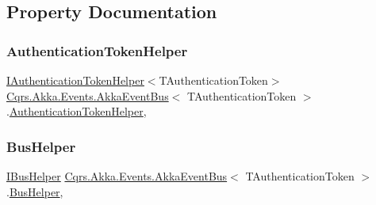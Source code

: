 \subsection{Property Documentation}
\mbox{\label{classCqrs_1_1Akka_1_1Events_1_1AkkaEventBus_a03166dfca723430ae548e833a2262632_a03166dfca723430ae548e833a2262632}} 
\subsubsection{\texorpdfstring{Authentication\+Token\+Helper}{AuthenticationTokenHelper}}
{\footnotesize\ttfamily \hyperlink{interfaceCqrs_1_1Authentication_1_1IAuthenticationTokenHelper}{I\+Authentication\+Token\+Helper}$<$T\+Authentication\+Token$>$ \hyperlink{classCqrs_1_1Akka_1_1Events_1_1AkkaEventBus}{Cqrs.\+Akka.\+Events.\+Akka\+Event\+Bus}$<$ T\+Authentication\+Token $>$.\hyperlink{classCqrs_1_1Authentication_1_1AuthenticationTokenHelper}{Authentication\+Token\+Helper}\hspace{0.3cm}{\ttfamily [get]}, {\ttfamily [protected]}}

\mbox{\label{classCqrs_1_1Akka_1_1Events_1_1AkkaEventBus_a04311f852422c212c4dfa35e8cc21e2e_a04311f852422c212c4dfa35e8cc21e2e}} 
\subsubsection{\texorpdfstring{Bus\+Helper}{BusHelper}}
{\footnotesize\ttfamily \hyperlink{interfaceCqrs_1_1Bus_1_1IBusHelper}{I\+Bus\+Helper} \hyperlink{classCqrs_1_1Akka_1_1Events_1_1AkkaEventBus}{Cqrs.\+Akka.\+Events.\+Akka\+Event\+Bus}$<$ T\+Authentication\+Token $>$.\hyperlink{classCqrs_1_1Bus_1_1BusHelper}{Bus\+Helper}\hspace{0.3cm}{\ttfamily [get]}, {\ttfamily [protected]}}

